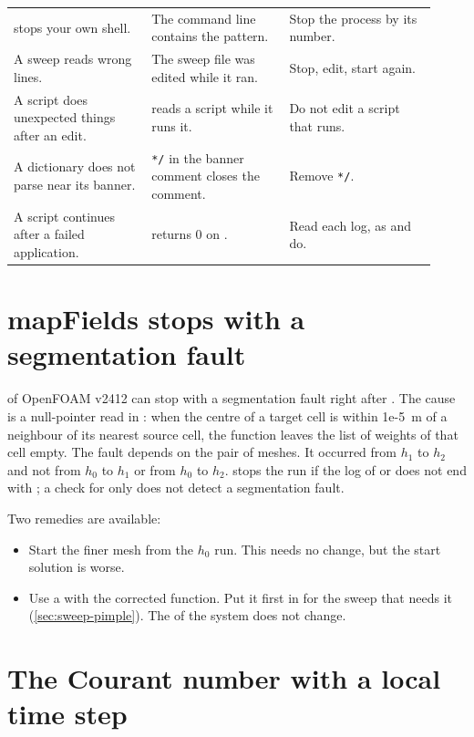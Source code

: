 \begin{longtable}{@{}P{0.30\linewidth} P{0.30\linewidth} P{0.32\linewidth}@{}}
 stops your own shell. & The command line contains the pattern. & Stop the process by its number. \\
A sweep reads wrong lines. & The sweep file was edited while it ran. & Stop, edit, start again. \\
A script does unexpected things after an edit. &  reads a script while it runs it. & Do not edit a script that runs. \\
A dictionary does not parse near its banner. & \texttt{*/} in the banner comment closes the comment. & Remove \texttt{*/}. \\
A script continues after a failed application. &  returns 0 on . & Read each log, as  and  do. \\
\bottomrule
\end{longtable}

\section{mapFields stops with a segmentation fault}\label{sec:ts-mapfields}

 of OpenFOAM v2412 can stop with a segmentation fault right
after . The cause is a null-pointer read in
: when the centre of a target cell
is within 1e-5~m of a neighbour of its nearest source cell, the function leaves the
list of weights of that cell empty. The fault depends on the pair of meshes. It
occurred from $h_1$ to $h_2$ and not from $h_0$ to $h_1$ or from $h_0$ to $h_2$.
 stops the run if the log of  or 
does not end with ; a check for  only does not detect a
segmentation fault.

Two remedies are available:

\begin{itemize}
\item Start the finer mesh from the $h_0$ run. This needs no change, but the start
  solution is worse.
\item Use a  with the corrected function. Put it first in 
  for the sweep that needs it (\cref{sec:sweep-pimple}). The  of the
  system does not change.
\end{itemize}

\section{The Courant number with a local time step}\label{sec:ts-courant}

